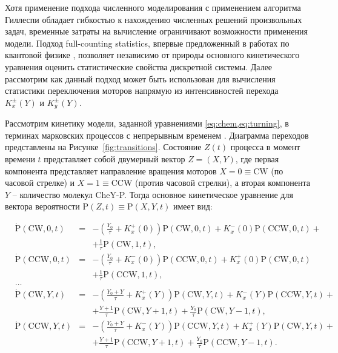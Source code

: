 Хотя применение подхода численного моделирования с применением алгоритма Гиллеспи \cite{gillespie_stochastic_2007} обладает гибкостью к нахождению численных решений произвольных задач, временные затраты на вычисление ограничивают возможности применения модели. Подход full-counting statistics, впервые предложенный в работах по квантовой физике \cite{levitov_electron_1996}, позволяет независимо от природы основного кинетического уравнения оценить статистические свойства дискретной системы. Далее рассмотрим как данный подход может быть использован для вычисления статистики переключения моторов напрямую из интенсивностей перехода $K_x^\pm(Y)$ и $K_y^\pm(Y)$.

Рассмотрим кинетику модели, заданной уравнениями \cref{eq:chem,eq:turning}, в терминах марковских процессов с непрерывным временем \cite{tikhonov_markov_process_1977}. Диаграмма переходов представлены на Рисунке~\cref{fig:transitions}. Состояние $Z(t)$ процесса в момент времени $t$ представляет собой двумерный вектор $Z = (X, Y)$, где первая компонента представляет направление вращения моторов $X = 0 \equiv \mathrm{CW}$ (по часовой стрелке) и $X = 1 \equiv \mathrm{CCW}$ (против часовой стрелки), а вторая компонента $Y$ -- количество молекул CheY-P. Тогда основное кинетическое уравнение для вектора вероятности $\mathrm{P}(Z, t) \equiv \mathrm{P}(X, Y, t)$ имеет вид:

\begin{equation}
    \begin{aligned}
        &\dot{\mathrm{P}}(\mathrm{CW},0,t)&=&-\left (\frac{Y_0}{\tau} + K_x^+(0) \right ) \mathrm{P}(\mathrm{CW},0,t) + K_x^-(0) \mathrm{P}(\mathrm{CCW},0,t)+&&\\
        &&&+\frac{1}{\tau}\mathrm{P}(\mathrm{CW},1,t),&&\\
        &\dot{\mathrm{P}}(\mathrm{CCW},0,t)&=&-\left (\frac{Y_0}{\tau} + K_x^-(0) \right ) \mathrm{P}(\mathrm{CCW},0,t) + K_x^+(0) \mathrm{P}(\mathrm{CW},0,t)&&\\
        &&&+\frac{1}{\tau}\mathrm{P}(\mathrm{CCW},1,t),&&\\
        &\dots&&\\
        &\dot{\mathrm{P}}(\mathrm{CW},Y,t)&=&-\left (\frac{Y_0+Y}{\tau} + K_x^+(Y) \right ) \mathrm{P}(\mathrm{CW},Y,t) + K_x^-(Y) \mathrm{P}(\mathrm{CCW},Y,t)+&&\\
        &&&+\frac{Y+1}{\tau}\mathrm{P}(\mathrm{CW},Y+1,t)+\frac{Y_0}{\tau}\mathrm{P}(\mathrm{CW},Y-1,t),&&\\
        &\dot{\mathrm{P}}(\mathrm{CCW},Y,t)&=&-\left (\frac{Y_0+Y}{\tau} + K_x^-(Y) \right ) \mathrm{P}(\mathrm{CCW},Y,t) + K_x^+(Y) \mathrm{P}(\mathrm{CW},Y,t)+&&\\
        &&&+\frac{Y+1}{\tau}\mathrm{P}(\mathrm{CCW},Y+1,t)+\frac{Y_0}{\tau}\mathrm{P}(\mathrm{CCW},Y-1,t).&&\\
    \end{aligned}
    \label{eq:master-transitions}
\end{equation}


